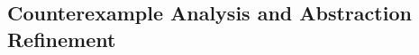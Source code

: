 {%
%
%
%


%

%




\subsection{Counterexample Analysis and Abstraction Refinement}\label{sec:CEXanalysis}

}

